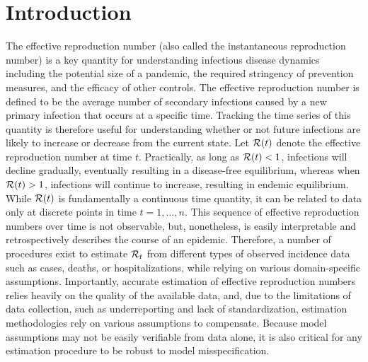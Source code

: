 \section{Introduction}
\label{sec:intro}

The effective reproduction number (also called the instantaneous reproduction
number) is a key quantity for understanding infectious disease dynamics
including the potential size of a pandemic, the required stringency of
prevention measures, and the efficacy of other controls. The effective
reproduction number is defined to be the average number of secondary infections
caused by a new primary infection that occurs at a specific time. Tracking the
time series of this quantity is therefore useful for understanding whether or
not future infections are likely to increase or decrease from the current state.
Let $\mathcal{R}(t)$ denote the effective reproduction number at time $t$.
Practically, as long as $\mathcal{R}(t) < 1$, infections will decline gradually,
eventually resulting in a disease-free equilibrium, whereas when $\mathcal{R}(t) > 1$,
infections will continue to increase, resulting in endemic equilibrium. 
%
While $\mathcal{R}(t)$ is fundamentally a continuous time quantity, it can be related
to data only at discrete points in time $t = 1,\ldots,n$.
This sequence of effective reproduction numbers over time is not observable, but,
nonetheless, is easily interpretable and retrospectively describes the course of
an epidemic. Therefore, a number of procedures exist to estimate $\mathcal{R}_t$ from
different types of observed incidence data such as cases, deaths, or
hospitalizations, while relying on various domain-specific assumptions.
Importantly, accurate estimation of effective reproduction numbers relies
heavily on the quality of the available data, and, due to the limitations of
data collection, such as underreporting and lack of standardization,
estimation methodologies rely on various assumptions to
compensate. Because model assumptions may not be easily verifiable from data
alone, it is also critical for any estimation procedure to be robust to model
misspecification. 

